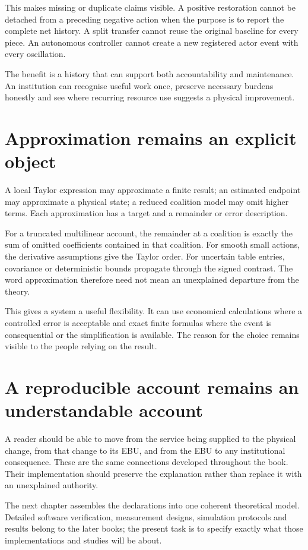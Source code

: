 This makes missing or duplicate claims visible. A positive restoration cannot be detached from a preceding negative action when the purpose is to report the complete net history. A split transfer cannot reuse the original baseline for every piece. An autonomous controller cannot create a new registered actor event with every oscillation.

The benefit is a history that can support both accountability and maintenance. An institution can recognise useful work once, preserve necessary burdens honestly and see where recurring resource use suggests a physical improvement.

\section{Approximation remains an explicit object}
A local Taylor expression may approximate a finite result; an estimated endpoint may approximate a physical state; a reduced coalition model may omit higher terms. Each approximation has a target and a remainder or error description.

For a truncated multilinear account, the remainder at a coalition is exactly the sum of omitted coefficients contained in that coalition. For smooth small actions, the derivative assumptions give the Taylor order. For uncertain table entries, covariance or deterministic bounds propagate through the signed contrast. The word approximation therefore need not mean an unexplained departure from the theory.

This gives a system a useful flexibility. It can use economical calculations where a controlled error is acceptable and exact finite formulas where the event is consequential or the simplification is available. The reason for the choice remains visible to the people relying on the result.

\section{A reproducible account remains an understandable account}
A reader should be able to move from the service being supplied to the physical change, from that change to its EBU, and from the EBU to any institutional consequence. These are the same connections developed throughout the book. Their implementation should preserve the explanation rather than replace it with an unexplained authority.

The next chapter assembles the declarations into one coherent theoretical model. Detailed software verification, measurement designs, simulation protocols and results belong to the later books; the present task is to specify exactly what those implementations and studies will be about.
